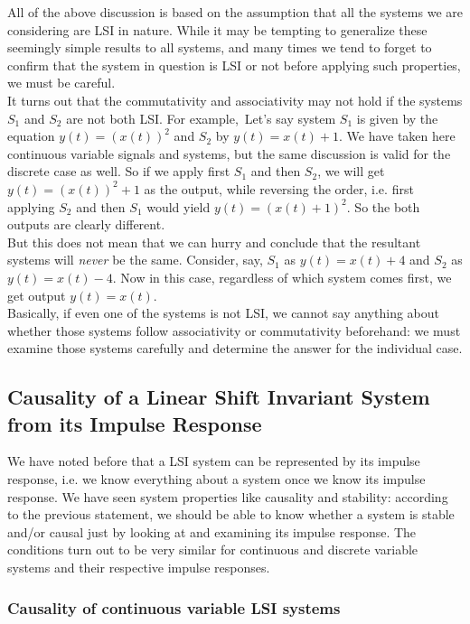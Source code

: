 All of the above discussion is based on the assumption that all the systems we are considering are LSI in nature. While it may be tempting to generalize these seemingly simple results to all systems, and many times we tend to forget to confirm that the system in question is LSI or not before applying such properties, we must be careful. \\
It turns out that the commutativity and associativity may not hold if the systems $S_{1}$ and $S_{2}$ are not both LSI. For example,\
Let's say system $S_{1}$ is given by the equation $y(t)=(x(t))^2$ and $S_{2}$ by $y(t)=x(t)+1$. We have taken here continuous variable signals and systems, but the same discussion is valid for the discrete case as well. So if we apply first $S_{1}$ and then $S_{2}$, we will get $y(t)=(x(t))^2 +1$ as the output, while reversing the order, i.e. first applying $S_{2}$ and then $S_{1}$ would yield $y(t)=(x(t)+1)^2$. So the both outputs are clearly different.\\
But this does not mean that we can hurry and conclude that the resultant systems will {\it never} be the same. Consider, say, $S_{1}$ as $y(t)=x(t)+4$ and $S_{2}$ as $y(t)=x(t)-4$. Now in this case, regardless of which system comes first, we get output $y(t)=x(t)$.\\
Basically, if even one of the systems is not LSI, we cannot say anything about whether those systems follow associativity or commutativity beforehand: we must examine those systems carefully and determine the answer for the individual case.


\subsection{Causality of a Linear Shift Invariant System from its Impulse Response}

We have noted before that a LSI system can be represented by its impulse response, i.e. we know everything about a system once we know its impulse response. We have seen system properties like causality and stability: according to the previous statement, we should be able to know whether a system is stable and/or causal just by looking at and examining its impulse response. The conditions turn out to be very similar for continuous and discrete variable systems and their respective impulse responses.

\subsubsection{Causality of continuous variable LSI systems}

